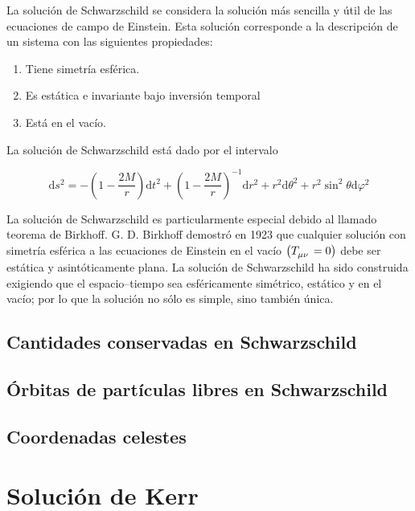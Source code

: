 \documentclass[10pt]{article}
\begin{document}
La solución de Schwarzschild se considera la solución más sencilla y útil de las ecuaciones de campo de Einstein. Esta solución corresponde a la descripción de un sistema con las siguientes propiedades: \cite{Luminet_1979} \cite{Amarilla_2012} \cite{Amarilla_2018}

\begin{enumerate}
\item Tiene simetría esférica.
\item Es estática e invariante bajo inversión temporal
\item Está en el vacío. 
\end{enumerate}

La solución de Schwarzschild está dado por el intervalo

\begin{equation}
\text{d}s^{2} = -\left( 1 - \dfrac{2M}{r} \right)\text{d}t^{2} + \left( 1 - \dfrac{2M}{r} \right)^{-1}\text{d}r^{2}
+ r^{2}\text{d}\theta^{2} + r^{2}\sin^{2}\theta\text{d}\varphi^{2}
\label{ec:intervalo Schwarzschild}
\end{equation}

La solución de Schwarzschild es particularmente especial debido al llamado teorema de Birkhoff. G. D. Birkhoff demostró en 1923 que cualquier solución con simetría esférica a las ecuaciones de Einstein en el vacío $ \left( \tensor{T}{_\mu_\nu} = 0 \right) $ debe ser estática y asintóticamente plana. La solución de Schwarzschild ha sido construida exigiendo que el espacio–tiempo sea esféricamente simétrico, estático y en el vacío; por lo que la solución no sólo es simple, sino también única.

\subsection{Cantidades conservadas en Schwarzschild}

\subsection{Órbitas de partículas libres en Schwarzschild}

\subsection{Coordenadas celestes}

\section{Solución de Kerr}
\end{document}
